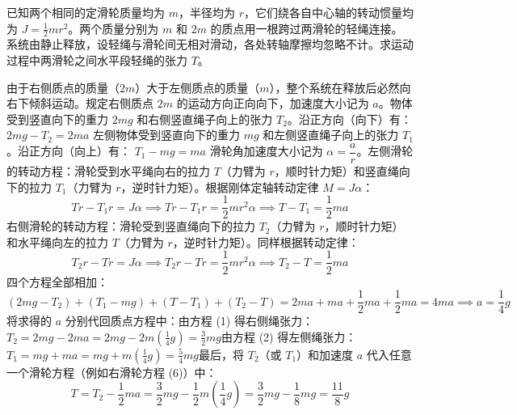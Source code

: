 \begin{exercise}
已知两个相同的定滑轮质量均为 $m$，半径均为 $r$，它们绕各自中心轴的转动惯量均为 $J = \frac{1}{2}mr^2$。两个质量分别为 $m$ 和 $2m$ 的质点用一根跨过两滑轮的轻绳连接。系统由静止释放，设轻绳与滑轮间无相对滑动，各处转轴摩擦均忽略不计。求运动过程中两滑轮之间水平段轻绳的张力 $T$。
\end{exercise}
\begin{solution}
由于右侧质点的质量（$2m$）大于左侧质点的质量（$m$），整个系统在释放后必然向右下倾斜运动。规定右侧质点 $2m$ 的运动方向正向向下，加速度大小记为 $a$。物体受到竖直向下的重力 $2mg$ 和右侧竖直绳子向上的张力 $T_2$。沿正方向（向下）有： \(2mg - T_2 = 2ma\) 
左侧物体受到竖直向下的重力 $mg$ 和左侧竖直绳子向上的张力 $T_1$。沿正方向（向上）有： \(T_1 - mg = ma\) 
滑轮角加速度大小记为 $\alpha=\dfrac{a}{r}$。左侧滑轮的转动方程：滑轮受到水平绳向右的拉力 $T$（力臂为 $r$，顺时针力矩）和竖直绳向下的拉力 $T_1$（力臂为 $r$，逆时针力矩）。根据刚体定轴转动定律 $M = J\alpha$：
$$Tr - T_1r = J\alpha \implies Tr - T_1r = \frac{1}{2}mr^2\alpha\implies T - T_1 = \frac{1}{2}ma $$
右侧滑轮的转动方程：滑轮受到竖直绳向下的拉力 $T_2$（力臂为 $r$，顺时针力矩）和水平绳向左的拉力 $T$（力臂为 $r$，逆时针力矩）。同样根据转动定律：$$T_2r - Tr = J\alpha \implies T_2r - Tr = \frac{1}{2}mr^2\alpha\implies T_2 - T = \frac{1}{2}ma$$四个方程全部相加：$$(2mg - T_2) + (T_1 - mg) + (T - T_1) + (T_2 - T) = 2ma + ma + \frac{1}{2}ma + \frac{1}{2}ma=4ma\implies a = \frac{1}{4}g$$
将求得的 $a$ 分别代回质点方程中：由方程 (1) 得右侧绳张力：$T_2 = 2mg - 2ma = 2mg - 2m\left(\frac{1}{4}g\right) = \frac{3}{2}mg$由方程 (2) 得左侧绳张力：$T_1 = mg + ma = mg + m\left(\frac{1}{4}g\right) = \frac{5}{4}mg$最后，将 $T_2$（或 $T_1$）和加速度 $a$ 代入任意一个滑轮方程（例如右滑轮方程 (6)）中：$$T = T_2 - \frac{1}{2}ma = \frac{3}{2}mg - \frac{1}{2}m\left(\frac{1}{4}g\right) = \frac{3}{2}mg - \frac{1}{8}mg=\frac{11}{8}g$$
\end{solution}


